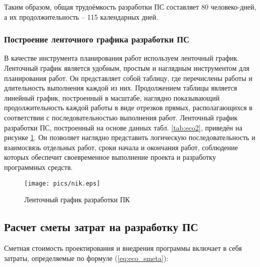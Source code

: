 Таким образом, общая трудоёмкость разработки ПС составляет  80 человеко-дней, а их продолжительность – 115 календарных дней.

\subsubsection*{Построение ленточного графика разработки ПС}
В качестве инструмента планирования работ используем ленточный график. Ленточный график является удобным, простым и наглядным
инструментом для планирования работ. Он представляет собой таблицу, где перечислены  работы и длительность выполнения каждой
из них. Продолжением таблицы является линейный график, построенный в масштабе, наглядно показывающий продолжительность
каждой работы в виде отрезков прямых,  располагающихся в соответствии с последовательностью выполнения работ. Ленточный график
разработки ПС, построенный на основе данных табл. \ref{tab:eco2}, приведён на рисунке \ref{pic:line_graphic}.
Он позволяет наглядно представить логическую последовательность и взаимосвязь отдельных работ, сроки начала и окончания работ,
соблюдение которых обеспечит своевременное выполнение проекта и разработку программных средств.

\begin{landscape}
\begin{figure}[htb!]
\begin{center}
\texttt{[image: pics/nik.eps]}
\end{center}
\caption{Ленточный график разработки ПК}
\label{pic:line_graphic}
\end{figure}
\end{landscape}


\subsection{Расчет сметы затрат на  разработку ПС}
Сметная стоимость проектирования и внедрения программы включает в себя  затраты, определяемые по формуле (\ref{eq:eco_smeta}):

